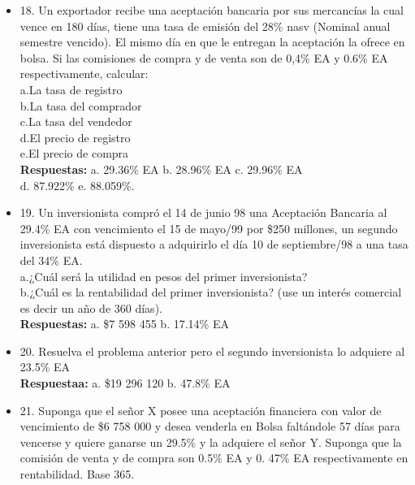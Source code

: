 \begin{itemize}
	\item 18. Un exportador recibe una aceptación bancaria por sus mercancías la cual vence en 180 días, tiene una tasa de emisión del 28\% nasv  (Nominal anual semestre vencido). El mismo día en que le entregan la aceptación la ofrece en bolsa. Si las comisiones de compra y de venta son de 0,4\% EA y 0.6\% EA respectivamente, calcular:\\
	
	a.La tasa de registro\\
	b.La tasa del comprador\\
	c.La tasa del vendedor\\
	d.El precio de registro\\
	e.El precio de compra\\
	\textbf{Respuestas:} a. 29.36\% EA\hspace{0,5cm} b. 28.96\% EA\hspace{0,5cm}  c. 29.96\% EA\hspace{0,5cm} \\
	d. 87.922\% \hspace{0,5cm} e. 88.059\%.\\
	\medskip
	\item 19. Un inversionista compró el 14 de junio 98 una Aceptación Bancaria al 29.4\% EA con vencimiento el 15 de mayo/99 por \$250 millones, un segundo inversionista está dispuesto a adquirirlo el día 10 de septiembre/98 a una tasa del 34\% EA.\\
	
	a.¿Cuál será la utilidad en pesos del primer inversionista?\\
	b.¿Cuál es la rentabilidad del primer inversionista? (use un interés comercial es decir un año de 360 días).\\
	\textbf{Respuestas:} a. \$7 598 455\hspace{1.0cm} b. 17.14\% EA\\
	\medskip
	\item 20. Resuelva el problema anterior pero el segundo inversionista lo adquiere al 23.5\% EA\\
	\textbf{Respuestaa:} a. \$19 296 120\hspace{1,0cm} b. 47.8\% EA\\
	\medskip
	\item 21. Suponga que el señor X posee una aceptación financiera con valor de vencimiento de \$6 758 000 y desea venderla en Bolsa faltándole 57 días para vencerse y quiere ganarse un 29.5\% y la adquiere el señor Y. Suponga que la comisión de venta y de compra son 0.5\% EA y 0. 47\% EA respectivamente en rentabilidad. Base 365.\\
	

\end{itemize}
